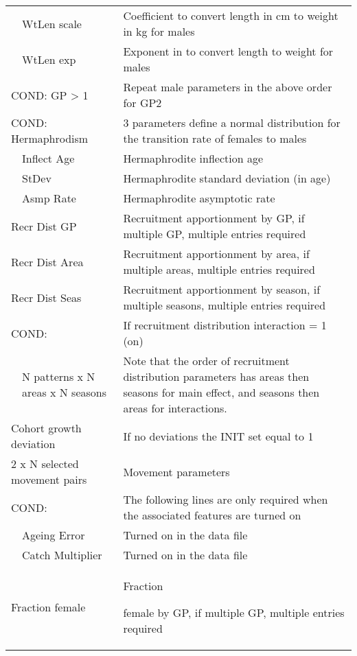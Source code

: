 \begin{center}
\begin{longtable}{p{1cm} p{2.5cm} p{10cm}}
		\hline
		& WtLen scale & Coefficient to convert length in cm to weight in kg for males\\
	    & WtLen exp & Exponent in to convert length to weight for males\\
		\hline
		\multicolumn{2}{l}{COND: GP > 1} & Repeat male parameters in the above order for GP2\\
		\hline
		\multicolumn{2}{l}{COND: Hermaphrodism} & 3 parameters define a normal distribution for the transition rate of females to males\\
		& Inflect Age & Hermaphrodite inflection age\\
		& StDev & Hermaphrodite standard deviation (in age) \\
		& Asmp Rate & Hermaphrodite asymptotic rate\\
		\hline
		\multicolumn{2}{l}{Recr Dist GP} & Recruitment apportionment by GP, if multiple GP, multiple entries required\\
		\multicolumn{2}{l}{Recr Dist Area} & Recruitment apportionment by area, if multiple areas, multiple entries required\\
		\multicolumn{2}{l}{Recr Dist Seas} & Recruitment apportionment by season, if multiple seasons, multiple entries required\\
		\hline
		\multicolumn{2}{l}{COND:} & If recruitment distribution interaction = 1 (on)\\
		& N patterns x N areas x N seasons & Note that the order of recruitment distribution parameters has areas then seasons for main effect, and seasons then areas for interactions.\\
		\hline
		\multicolumn{2}{l}{Cohort growth deviation} & If no deviations the INIT set equal to 1\\
		\multicolumn{2}{l}{2 x N selected movement pairs} & Movement parameters\\
		\hline
		\multicolumn{2}{l}{COND:} & The following lines are only required when the associated features are turned on\\
		& Ageing Error & Turned on in the data file\\
		& Catch Multiplier & Turned on in the data file\\
		\hline
		\multicolumn{2}{l}{Fraction female} & \hypertarget{SexRatio}{Fraction} female by GP, if multiple GP, multiple entries required\\
		\hline
	\end{longtable}
\end{center}

